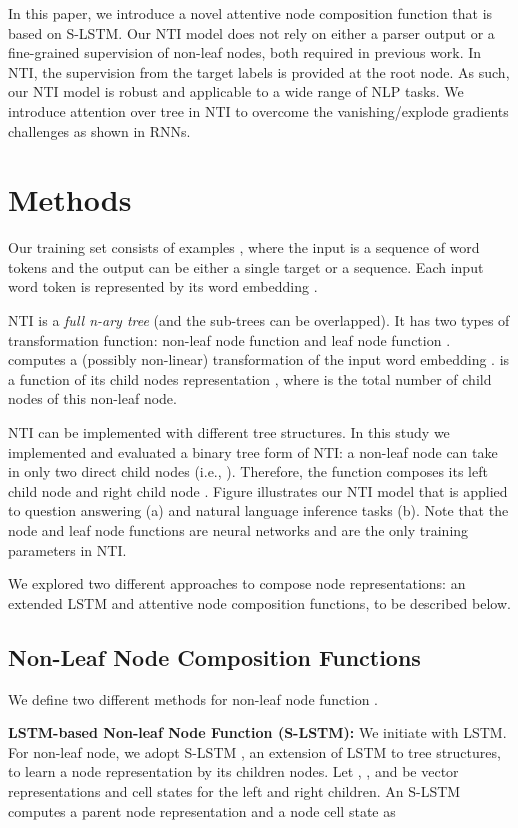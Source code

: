 \documentclass[11pt]{article}
\begin{document}
In this paper, we introduce a novel attentive node composition function that is based on S-LSTM. Our NTI model does not rely on either a parser output or a fine-grained supervision of non-leaf nodes, both required in previous work. In NTI, the supervision from the target labels is provided at the root node. As such, our NTI model is robust and applicable to a wide range of NLP tasks. We introduce attention over tree in NTI to overcome the vanishing/explode gradients challenges as shown in RNNs. 

\section{Methods}

Our training set consists of  examples , where the input  is a sequence of word tokens  and the output  can be either a single target or a sequence. Each input word token  is represented by its word embedding .

NTI is a \textit{full n-ary tree} (and the sub-trees can be overlapped). It has two types of transformation function: non-leaf node function  and leaf node function .  computes a (possibly non-linear) transformation of the input word embedding .  is a function of its child nodes representation , where   is the total number of child nodes of this non-leaf node. 

NTI can be implemented with different tree structures. In this study we implemented and evaluated a binary tree form of NTI: a non-leaf node can take in only two direct child nodes (i.e., ). Therefore, the function  composes its left child node  and right child node . Figure  illustrates our NTI model that is applied to question answering (a) and natural language inference tasks (b). Note that the node and leaf node functions are neural networks and are the only training parameters in NTI.  

We explored two different approaches to compose node representations: an extended LSTM and attentive node composition functions, to be described below.    

\subsection{Non-Leaf Node Composition Functions}
We define two different methods for non-leaf node function .

\textbf{LSTM-based Non-leaf Node Function (S-LSTM):} We initiate  with LSTM. For non-leaf node, we adopt S-LSTM , an extension of LSTM to tree structures, to learn a node representation by its children nodes. Let , ,  and  be vector representations and cell states for the left and right children. An S-LSTM computes a parent node representation  and a node cell state  as
\end{document}
